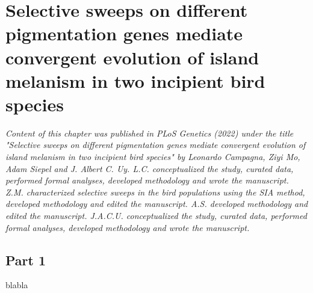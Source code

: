 \chapter{Selective sweeps on different pigmentation genes mediate convergent evolution of island melanism in two incipient bird species}

\textit{Content of this chapter was published in PLoS Genetics (2022) under the title "Selective sweeps on different pigmentation genes mediate convergent evolution of island melanism in two incipient bird species" by Leonardo Campagna, Ziyi Mo, Adam Siepel and J. Albert C. Uy. L.C. conceptualized the study, curated data, performed formal analyses, developed methodology and wrote the manuscript. Z.M. characterized selective sweeps in the bird populations using the SIA method, developed methodology and edited the manuscript. A.S. developed methodology and edited the manuscript. J.A.C.U. conceptualized the study, curated data, performed formal analyses, developed methodology and wrote the manuscript.}

\section{Part 1}
blabla